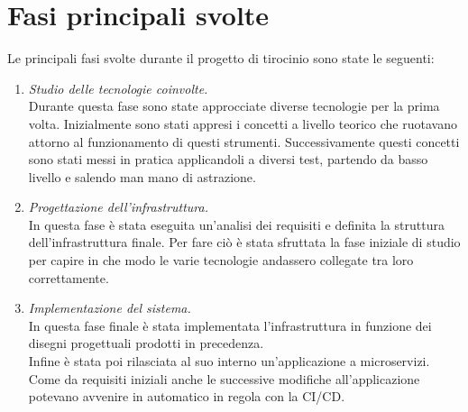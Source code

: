 \documentclass[a4paper,12pt]{report}
\begin{document}
\section{Fasi principali svolte}
Le principali fasi svolte durante il progetto di tirocinio sono state le seguenti:
\begin{enumerate}
\item \textit{Studio delle tecnologie coinvolte.} \\
Durante questa fase sono state approcciate diverse tecnologie per la prima volta. Inizialmente sono stati appresi i concetti a livello teorico che ruotavano attorno al funzionamento di questi strumenti. Successivamente questi concetti sono stati messi in pratica applicandoli a diversi test, partendo da basso livello e salendo man mano di astrazione.\\
\item \textit{Progettazione dell'infrastruttura.} \\
In questa fase è stata eseguita un'analisi dei requisiti e definita la struttura dell'infrastruttura finale. Per fare ciò è stata sfruttata la fase iniziale di studio per capire in che modo le varie tecnologie andassero collegate tra loro correttamente.
\item \textit{Implementazione del sistema.}\\
In questa fase finale è stata implementata l'infrastruttura in funzione dei disegni progettuali prodotti in precedenza.\\
Infine è stata poi rilasciata al suo interno un'applicazione a microservizi. \\
Come da requisiti iniziali anche le successive modifiche all'applicazione potevano avvenire in automatico in regola con la CI/CD. \\
\end{enumerate}
\end{document}

